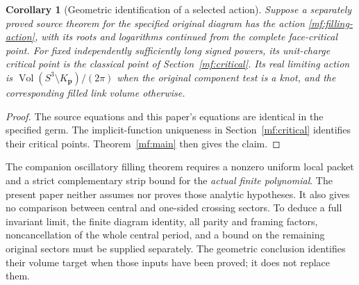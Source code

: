 \documentclass[11pt]{article}
\numberwithin{equation}{section}
\newtheorem{corollary}[theorem]{Corollary}
\theoremstyle{definition}
\theoremstyle{remark}
\newcommand{\Vol}{\operatorname{Vol}}
\begin{document}
\begin{corollary}[Geometric identification of a selected action]
\label{mf:interface-cor}
Suppose a separately proved source theorem for the specified original
diagram has the action \eqref{mf:filling-action}, with its roots and
logarithms continued from the complete face-critical point.
For fixed independently sufficiently long signed powers, its
unit-charge critical point is the classical point of
Section~\ref{mf:critical}. Its real limiting action is
\(\Vol(S^3\setminus K_{\mathbf p})/(2\pi)\) when the original
component test is a knot, and the corresponding filled link volume
otherwise.
\end{corollary}
\begin{proof}
The source equations and this paper's equations are identical in
the specified germ. The implicit-function uniqueness in
Section~\ref{mf:critical} identifies their critical points.
Theorem~\ref{mf:main} then gives the claim.
\end{proof}

The companion oscillatory filling theorem
\cite[Theorem 1.1]{OscillatoryFillings} requires a nonzero uniform
local packet and a strict complementary strip bound for the
\emph{actual finite polynomial}. The present paper neither assumes
nor proves those analytic hypotheses. It also gives no comparison
between central and one-sided crossing sectors. To deduce a full
invariant limit, the finite diagram identity, all parity and framing
factors, noncancellation of the whole central period, and a bound on
the remaining original sectors must be supplied separately.
The geometric conclusion identifies their volume target when those
inputs have been proved; it does not replace them.
\end{document}
